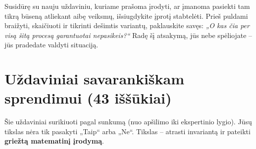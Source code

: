 \documentclass[11pt,a4paper]{scrartcl}
\begin{document}
Susidūrę su nauju uždaviniu, kuriame prašoma įrodyti, ar įmanoma pasiekti tam tikrą būseną atliekant aibę veiksmų, išsiugdykite įprotį stabtelėti. Prieš puldami braižyti, skaičiuoti ir tikrinti dešimtis variantų, paklauskite savęs: \textit{„O kas čia per visą šitą procesą garantuotai nepasikeis?“} Radę šį atsakymą, jūs nebe spėliojate – jūs pradedate valdyti  situaciją.
\vspace{1cm}

\newpage
\section{Uždaviniai savarankiškam sprendimui (43 iššūkiai)}

Šie uždaviniai surikiuoti pagal sunkumą (nuo apšilimo iki ekspertinio lygio). Jūsų tikslas nėra tik pasakyti „Taip“ arba „Ne“. Tikslas – atrasti invariantą ir pateikti \textbf{griežtą matematinį įrodymą}.
\end{document}
